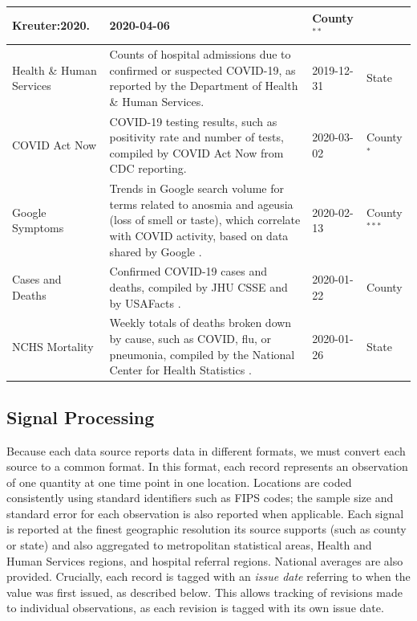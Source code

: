 \documentclass[9pt,twocolumn,twoside,lineno]{pnas-new}
\begin{document}
\begin{table}[t]
\begin{tabular}{>{\raggedright}p{1.2in} p{4.0in} l >{\raggedright\arraybackslash}p{0.5in}}
{Kreuter:2020}. & 2020-04-06 & County$^{**}$ \\
  \midrule
  Health \& Human Services & Counts of hospital admissions due to confirmed or
suspected COVID-19, as reported by the Department of Health \& Human Services. &
2019-12-31 & State \\
  COVID Act Now & COVID-19 testing results, such as positivity rate and number
of tests, compiled by COVID Act Now from CDC reporting. & 2020-03-02 &
County$^*$ \\
  Google Symptoms & Trends in Google search volume for terms related to
anosmia and ageusia (loss of smell or taste), which correlate with COVID
activity, based on data shared by Google \cite{GoogleSymptoms}. & 2020-02-13 &
County$^{***}$ \\
  Cases and Deaths & Confirmed COVID-19 cases and deaths, compiled by JHU CSSE
\cite{Dong:2020} and by USAFacts \cite{USAFacts}. & 2020-01-22 & County \\
    NCHS Mortality & Weekly totals of deaths broken down by cause, such as
COVID, flu, or pneumonia, compiled by the National Center for Health Statistics
\cite{NCHS}. & 2020-01-26 & State \\
  \bottomrule
\end{tabular}
\label{tab:sources_signals}
\end{table}

\subsection{Signal Processing}

Because each data source reports data in different formats, we must convert each
source to a common format. In this format, each record represents an observation
of one quantity at one time point in one location. Locations are coded
consistently using standard identifiers such as FIPS codes; the sample size and
standard error for each observation is also reported when applicable. Each
signal is reported at the finest geographic resolution its source supports (such
as county or state) and also aggregated to metropolitan statistical areas,
Health and Human Services regions, and hospital referral regions. National
averages are also provided. Crucially, each record is tagged with an
\textit{issue date} referring to when the value was first issued, as described
below. This allows tracking of revisions made to individual observations, as
each revision is tagged with its own issue date.
\end{document}

